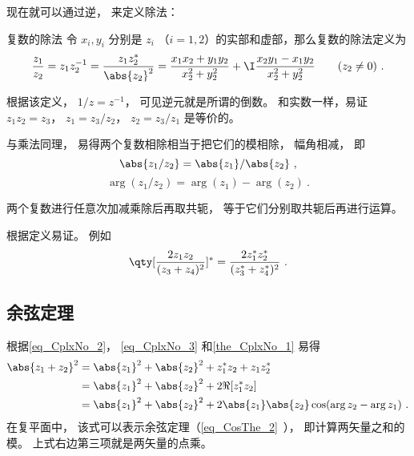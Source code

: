 现在就可以通过逆， 来定义除法：
\begin{definition}{复数的除法}
令 $x_i,y_i$ 分别是 $z_i$ （$i=1,2$）的实部和虚部，那么复数的除法定义为
\begin{equation}\label{eq_CplxNo_7}
\frac{z_1}{z_2} = z_1z_2^{-1} = \frac{z_1z_2^*}{\abs{z_2}^2} = \frac{x_1 x_2 + y_1 y_2}{x_2^2 + y_2^2} + \I \frac{x_2 y_1 - x_1 y_2}{x_2^2 + y_2^2} \qquad (z_2 \ne 0)~.
\end{equation}
\end{definition}
根据该定义， $1/z = z^{-1}$， 可见逆元就是所谓的倒数。 和实数一样，易证 $z_1z_2 = z_3$， $z_1 = z_3/z_2$， $z_2 = z_3/z_1$ 是等价的。

与乘法同理， 易得两个复数相除相当于把它们的模相除， 幅角相减， 即
\begin{equation}
\abs{z_1/z_2} = \abs{z_1}/\abs{z_2}~,
\end{equation}
\begin{equation}
\arg(z_1/z_2) = \arg(z_1) - \arg(z_2)~.
\end{equation}

\begin{theorem}{}\label{the_CplxNo_1}
两个复数进行任意次加减乘除后再取共轭， 等于它们分别取共轭后再进行运算。
\end{theorem}
根据定义易证。 例如
\begin{equation}
\qty[\frac{2 z_1 z_2}{(z_3 + z_4)^2}]^* = \frac{2 z_1^* z_2^*}{(z_3^* + z_4^*)^2}~.
\end{equation}

\subsection{余弦定理}
根据\autoref{eq_CplxNo_2}， \autoref{eq_CplxNo_3} 和\autoref{the_CplxNo_1} 易得
\begin{equation}
\begin{aligned}
\abs{z_1 + z_2}^2 &= \abs{z_1}^2 + \abs{z_2}^2 + z_1^* z_2 + z_1 z_2^*\\
&= \abs{z_1}^2 + \abs{z_2}^2 + 2\Re[z_1^* z_2]\\
&= \abs{z_1}^2 + \abs{z_2}^2 + 2\abs{z_1}\abs{z_2}\cos(\arg z_2 - \arg z_1)~.
\end{aligned}
\end{equation}
在复平面中， 该式可以表示余弦定理（\autoref{eq_CosThe_2}~）， 即计算两矢量之和的模。 上式右边第三项就是两矢量的点乘。


